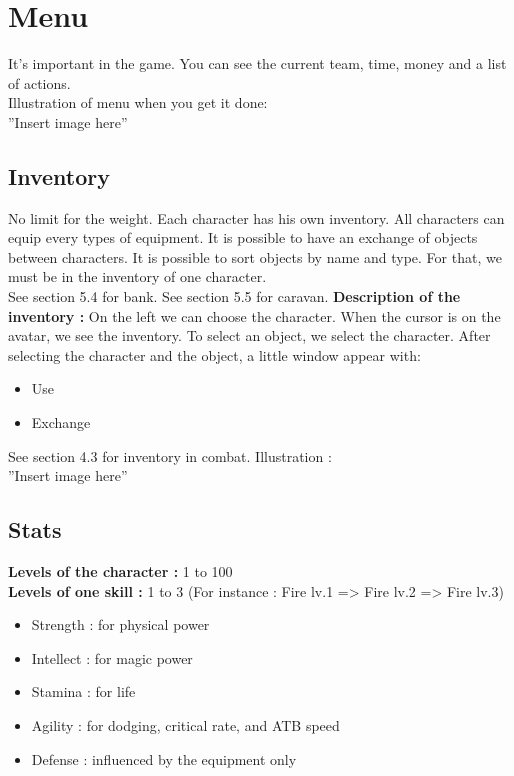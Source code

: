 \documentclass[a4paper,12pt]{book}
\begin{document}
\section{Menu}
It's important in the game. You can see the current team, time, money and a list of actions. \\ Illustration of menu when you get it done: \\ ''Insert image here''
\subsection{Inventory}
No limit for the weight. Each character has his own inventory. All characters can equip every types of equipment. It is possible to have an exchange of objects between characters. It is possible to sort objects by name and type. For that, we must be in the inventory of one character. \\
See section 5.4 for bank.
See section 5.5 for caravan.
\textbf{Description of the inventory :} On the left we can choose the character. When the cursor is on the avatar, we see the inventory. To select an object, we select the character. After selecting the character and the object, a little window appear with:
\begin{itemize}
	\item Use
	\item Exchange
\end{itemize}
See section 4.3 for inventory in combat.
Illustration : \\ ''Insert image here''
\subsection{Stats}
\textbf{Levels of the character :} 1 to 100 \\
\textbf{Levels of one skill :} 1 to 3 \newpage (For instance : Fire lv.1 => Fire lv.2 => Fire lv.3)
\begin{itemize}
	\item Strength : for physical power
	\item Intellect : for magic power
	\item Stamina : for life
	\item Agility : for dodging, critical rate, and ATB speed
	\item Defense : influenced by the equipment only
\end{itemize}
\end{document}
